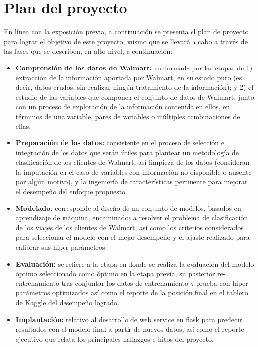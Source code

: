 \documentclass[]{book}
\providecommand{\tightlist}{%
  \setlength{\itemsep}{0pt}\setlength{\parskip}{0pt}}
\begin{document}
\hypertarget{plan-del-proyecto}{%
\section{Plan del proyecto}\label{plan-del-proyecto}}

En línea con la exposición previa, a continuación se presenta el plan de proyecto para lograr el objetivo de este proyecto, mismo que se llevará a cabo a través de las fases que se describen, en alto nivel, a continuación:

\begin{itemize}
\tightlist
\item
  \textbf{Comprensión de los datos de Walmart:} conformada por las etapas de 1) extracción de la información aportada por Walmart, en su estado puro (es decir, datos crudos, sin realizar ningún tratamiento de la información); y 2) el estudio de las variables que componen el conjunto de datos de Walmart, junto con un proceso de exploración de la información contenida en ellos, en términos de una variable, pares de variables o múltiples combinaciones de ellas.
\item
  \textbf{Preparación de los datos:} consistente en el proceso de selección e integración de los datos que serán útiles para plantear un metodología de clasificación de los clientes de Walmart, así limpieza de los datos (consideran la imputación en el caso de variables con información no disponible o ausente por algún motivo), y la ingeniería de características pertinente para mejorar el desempeño del enfoque propuesto.
\item
  \textbf{Modelado:} corresponde al diseño de un conjunto de modelos, basados en aprendizaje de máquina, encaminados a resolver el problema de clasificación de los viajes de los clientes de Walmart, así como los criterios considerados para seleccionar el modelo con el mejor desempeño y el ajuste realizado para calibrar sus hiper-parámetros.
\item
  \textbf{Evaluación:} se refiere a la etapa en donde se realiza la evaluación del modelo óptimo seleccionado como óptimo en la etapa previa, su posterior re-entrenamiento tras conjuntar los datos de entrenamiento y prueba con hiper-parámetros optimizados así como el reporte de la posición final en el tablero de Kaggle del desempeño logrado.
\item
  \textbf{Implantación:} relativo al desarrollo de web service en flask para predecir resultados con el modelo final a partir de nuevos datos, así como el reporte ejecutivo que relata los principales hallazgos e hitos del proyecto.
\end{itemize}
\end{document}
